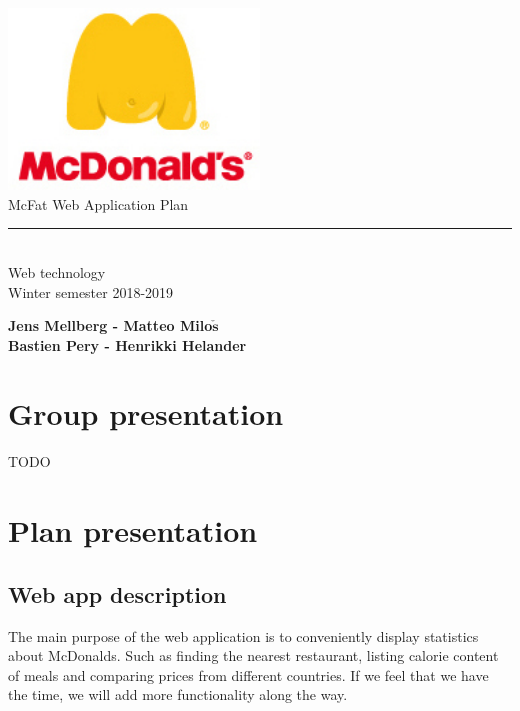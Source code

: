 \documentclass[12pt]{article}
\begin{document}
\begin{titlepage}
        \begin{center}
            \includegraphics[width=0.5\textwidth]{./Pictures/mcdonalds-fat-logo.jpg}\\
            \vspace{1cm}
            \Large McFat Web Application Plan\\
            \rule{5cm}{.5pt}\\
            \vspace{0.6cm}
            {\Large Web technology}\\
            \vspace{0.1cm}
            {\Large Winter semester 2018-2019} \\
            \vspace{3em}

            \textbf{Jens Mellberg - Matteo Milo$\mathbf{\check{s}}$}\\
            \textbf{Bastien Pery - Henrikki Helander}
        \end{center}

    \end{titlepage}

    \renewcommand{\contentsname}{\color{color_section}\\Table of contents}
    \tableofcontents

    \newpage

    {\color{color_section}\section{Group presentation}}
        TODO


    {\color{color_section}\section{Plan presentation}}
        {\color{color_subsection}\subsection{Web app description}}
           The main purpose of the web application is to conveniently display statistics about McDonalds. Such as finding the nearest restaurant, listing calorie content of meals and comparing prices from different countries. If we feel that we have the time, we will add more functionality along the way.
\end{document}
